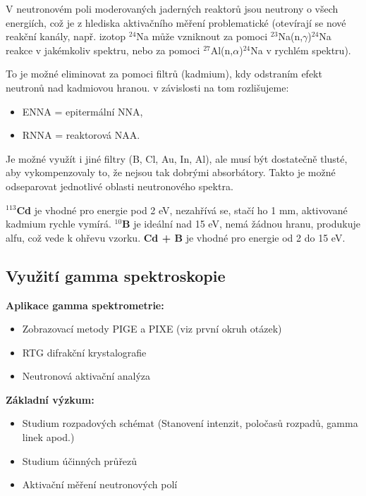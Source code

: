 V neutronovém poli moderovaných jaderných reaktorů jsou neutrony o všech energiích, což je z hlediska aktivačního měření problematické (otevírají se nové reakční kanály, např. izotop $^{24}$Na může vzniknout za pomoci $^{23}$Na(n,$\gamma$)$^{24}$Na reakce v jakémkoliv spektru, nebo za pomoci $^{27}$Al(n,$\alpha$)$^{24}$Na v rychlém spektru). 

To je možné eliminovat za pomoci filtrů (kadmium), kdy odstraním efekt neutronů nad kadmiovou hranou. v závislosti na tom rozlišujeme:

\begin{itemize}
    \item ENNA = epitermální NNA,
    \item RNNA = reaktorová NAA.
\end{itemize}

Je možné využít i jiné filtry (B, Cl, Au, In, Al), ale musí být dostatečně tlusté, aby vykompenzovaly to, že nejsou tak dobrými absorbátory. Takto je možné odseparovat jednotlivé oblasti neutronového spektra.

\textbf{$^{113}$Cd} je vhodné pro energie pod 2 eV, nezahřívá se, stačí ho 1 mm, aktivované kadmium rychle vymírá. \textbf{$^{10}$B} je ideální nad 15 eV, nemá žádnou hranu, produkuje alfu, což vede k ohřevu vzorku. \textbf{Cd + B} je vhodné pro energie od 2 do 15 eV. 

\subsection{Využití gamma spektroskopie}

\textbf{Aplikace gamma spektrometrie:}

\begin{itemize}
    \item Zobrazovací metody PIGE a PIXE (viz první okruh otázek)
    \item RTG difrakční krystalografie
    \item Neutronová aktivační analýza
\end{itemize}

\textbf{Základní výzkum:}

\begin{itemize}
    \item Studium rozpadových schémat (Stanovení intenzit, poločasů rozpadů, gamma linek apod.)
    \item Studium účinných průřezů
    \item Aktivační měření neutronových polí
\end{itemize}